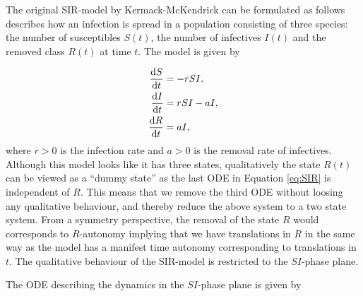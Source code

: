 The original SIR-model by Kermack-McKendrick can be formulated as follows describes how an infection is spread in a population consisting of three species: the number of susceptibles $S(t)$, the number of infectives $I(t)$ and the removed class $R(t)$ at time $t$. The model is given by

\begin{equation}
  \begin{split}
    \dv{S}{t}&=-rSI,\\
    \dv{I}{t}&=rSI-aI,\\
    \dv{R}{t}&=aI,\\
    \end{split}
  \label{eq:SIR}
\end{equation}
where $r>0$ is the infection rate and $a>0$ is the removal rate of infectives. Although this model looks like it has three states, qualitatively the state $R(t)$ can be viewed as a ``dummy state'' as the last ODE in Equation \eqref{eq:SIR} is independent of $R$. This means that we remove the third ODE without loosing any qualitative behaviour, and thereby reduce the above system to a two state system. From a symmetry perspective, the removal of the state $R$ would corresponds to $R$-autonomy implying that we have translations in $R$ in the same way as the model has a manifest time autonomy corresponding to translations in $t$. The qualitative behaviour of the SIR-model is restricted to the $SI$-phase plane.

The ODE describing the dynamics in the $SI$-phase plane is given by

